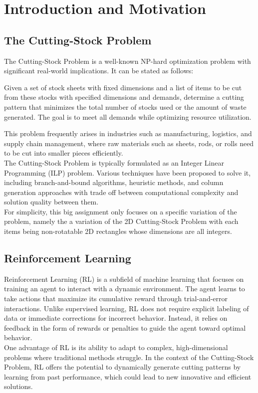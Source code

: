 \documentclass[a4paper]{article}
\begin{document}
    
    \pagebreak
    
    
    \section{Introduction and Motivation}

    \subsection{The Cutting-Stock Problem}

    The Cutting-Stock Problem is a well-known NP-hard optimization problem with significant real-world implications. It can be stated as follows:
    \begin{mdframed}
    Given a set of stock sheets with fixed dimensions and a list of items to be cut from these stocks with specified dimensions and demands, 
    determine a cutting pattern that minimizes the total number of stocks used or the amount of waste generated. The goal is to meet all demands while optimizing resource utilization.
    \end{mdframed}
    This problem frequently arises in industries such as manufacturing, logistics, and supply chain management, where raw materials such as sheets, rods, or rolls need to be cut into smaller pieces efficiently. 
    \vspace{0.15cm}\\
    The Cutting-Stock Problem is typically formulated as an Integer Linear Programming (ILP) problem. Various techniques have been proposed to solve it, including branch-and-bound algorithms, heuristic methods, and column generation approaches with trade off between computational complexity and solution quality between them.
    \vspace{0.15cm}\\
    For simplicity, this big assignment only focuses on a specific variation of the problem, namely the a variation of the 2D Cutting-Stock Problem with each items being non-rotatable 2D rectangles whose dimensions are all integers.
    
    \subsection{Reinforcement Learning}
    Reinforcement Learning (RL) is a subfield of machine learning that focuses on training an agent to interact with a dynamic environment. The agent learns to take actions that maximize its cumulative reward through trial-and-error interactions. Unlike supervised learning, RL does not require explicit labeling of data or immediate corrections for incorrect behavior. Instead, it relies on feedback in the form of rewards or penalties to guide the agent toward optimal behavior.
    \vspace{0.15cm}\\
    One advantage of RL is its ability to adapt to complex, high-dimensional problems where traditional methods struggle. In the context of the Cutting-Stock Problem, RL offers the potential to dynamically generate cutting patterns by learning from past performance, 
    which could lead to new innovative and efficient solutions.
\end{document}

